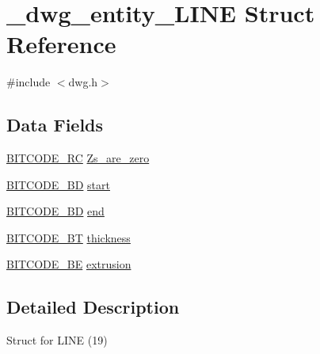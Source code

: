 \hypertarget{struct__dwg__entity__LINE}{\section{\-\_\-dwg\-\_\-entity\-\_\-\-L\-I\-N\-E \-Struct \-Reference}
\label{struct__dwg__entity__LINE}
}


{\ttfamily \#include $<$dwg.\-h$>$}

\subsection*{\-Data \-Fields}
\begin{DoxyCompactItemize}
\item 
\hyperlink{dwg_8h_a7fd199a8f9c9cc52bdab220f65a2a619}{\-B\-I\-T\-C\-O\-D\-E\-\_\-\-R\-C} \hyperlink{struct__dwg__entity__LINE_aba3dbe01803d30f0ddb0ef0972c7e47e}{\-Zs\-\_\-are\-\_\-zero}
\item 
\hyperlink{dwg_8h_a00698ef1bb072aa0a9360c6fc1c57587}{\-B\-I\-T\-C\-O\-D\-E\-\_\-B\-D} \hyperlink{struct__dwg__entity__LINE_a62c5dc3960f6edf2da4795e8a15eba51}{start}
\item 
\hyperlink{dwg_8h_a00698ef1bb072aa0a9360c6fc1c57587}{\-B\-I\-T\-C\-O\-D\-E\-\_\-B\-D} \hyperlink{struct__dwg__entity__LINE_ac4c71335e259516dea86d163b90887e0}{end}
\item 
\hyperlink{dwg_8h_afc93a5ddc38aeff965d4e93c71514495}{\-B\-I\-T\-C\-O\-D\-E\-\_\-\-B\-T} \hyperlink{struct__dwg__entity__LINE_a78a7fc0ae322b5b21aa61bbd4e89e212}{thickness}
\item 
\hyperlink{dwg_8h_ac2622137c01aa3a719ec6c571d06ee6a}{\-B\-I\-T\-C\-O\-D\-E\-\_\-\-B\-E} \hyperlink{struct__dwg__entity__LINE_a07e9f114a97895c5dd9a88918b2a26db}{extrusion}
\end{DoxyCompactItemize}


\subsection{\-Detailed \-Description}
\-Struct for \-L\-I\-N\-E (19) 

